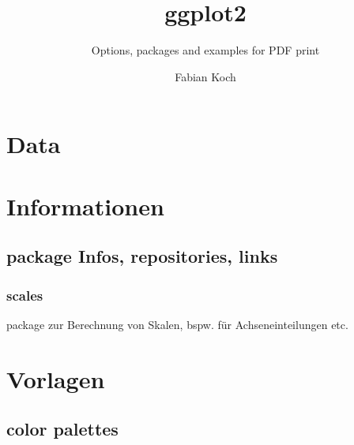 \documentclass[
]{article}
\title{ggplot2}
\subtitle{Options, packages and examples for PDF print}
\author{Fabian Koch}
\date{}
\begin{document}
\maketitle

\newpage 
\tableofcontents

\newpage

\hypertarget{data}{%
\section{Data}\label{data}}

\newpage

\hypertarget{informationen}{%
\section{Informationen}\label{informationen}}

\hypertarget{package-infos-repositories-links}{%
\subsection{package Infos, repositories,
links}\label{package-infos-repositories-links}}

\hypertarget{scales}{%
\subsubsection{scales}\label{scales}}

package zur Berechnung von Skalen, bspw. für Achseneinteilungen etc.

\hypertarget{vorlagen}{%
\section{Vorlagen}\label{vorlagen}}

\hypertarget{color-palettes}{%
\subsection{color palettes}\label{color-palettes}}
\end{document}
